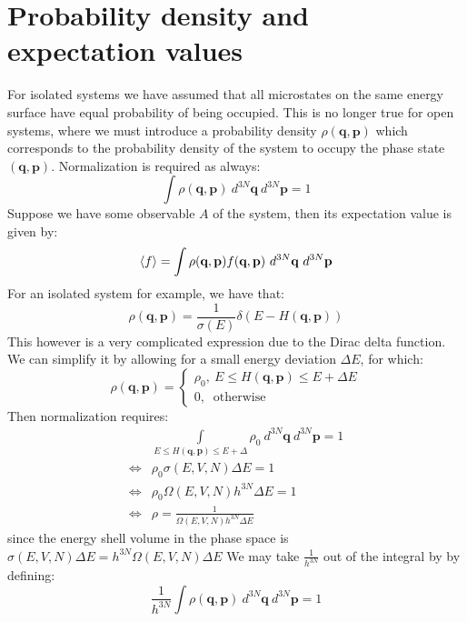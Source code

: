 \documentclass[a4paper,11pt,oneside]{book}
\begin{document}
\section{Probability density and expectation values}
For isolated systems we have assumed that all microstates on the same energy surface have equal probability of being occupied. This is no longer true for open systems, where we must introduce a probability density $\rho(\textbf{q}, \textbf{p})$ which corresponds to the probability density of the system to occupy the phase state $(\textbf{q},\textbf{p})$. Normalization is required as always:
\begin{equation}
    \int \rho(\textbf{q},\textbf{p})  \ d^{3N} \textbf{q}\  d^{3N} \textbf{p} = 1
\end{equation}
Suppose we have some observable $A$ of the system, then its expectation value is given by:
\begin{equation}
    \braket{f} =  \int \rho(\textbf{q},\textbf{p}) f(\textbf{q},\textbf{p})\ d^{3N} \textbf{q}\  d^{3N} \textbf{p} 
\end{equation}
For an isolated system for example, we have that:
\begin{equation}
    \rho(\textbf{q},\textbf{p})=\frac{1}{\sigma(E)}\delta(E-H(\textbf{q},\textbf{p}))
\end{equation}
This however is a very complicated expression due to the Dirac delta function. We can simplify it by allowing for a small energy deviation $\Delta E$, for which:
\begin{equation}
    \rho(\textbf{q},\textbf{p})=\begin{cases}
    \rho_0, \ E\leq H(\textbf{q},\textbf{p}) \leq E+\Delta E \\
    0, \ \text{ otherwise}
    \end{cases}
\end{equation}
Then normalization requires:
\begin{align}
    &\int \limits_{E\leq H(\textbf{q},\textbf{p}) \leq E+\Delta} \rho_0 \ d^{3N} \textbf{q}\ d^{3N} \textbf{p}  = 1\\
    \iff & \rho_0 \sigma(E,V,N) \Delta E = 1 \\
    \iff &\rho_0 \Omega(E,V,N) h^{3N} \Delta E  = 1 \\
    \iff &\rho = \frac{1}{\Omega(E,V,N) h^{3N} \Delta E}
\end{align}
since the energy shell volume in the phase space is $\sigma(E,V,N) \Delta E = h^{3N} \Omega(E,V,N) \Delta E$
We may take $\frac{1}{h^{3N}}$ out of the integral by by defining:
\begin{equation}
    \frac{1}{h^{3N}} \int \rho(\textbf{q},\textbf{p}) \ d^{3N} \textbf{q} \ d^{3N} \textbf{p}  = 1
\end{equation}
\end{document}
